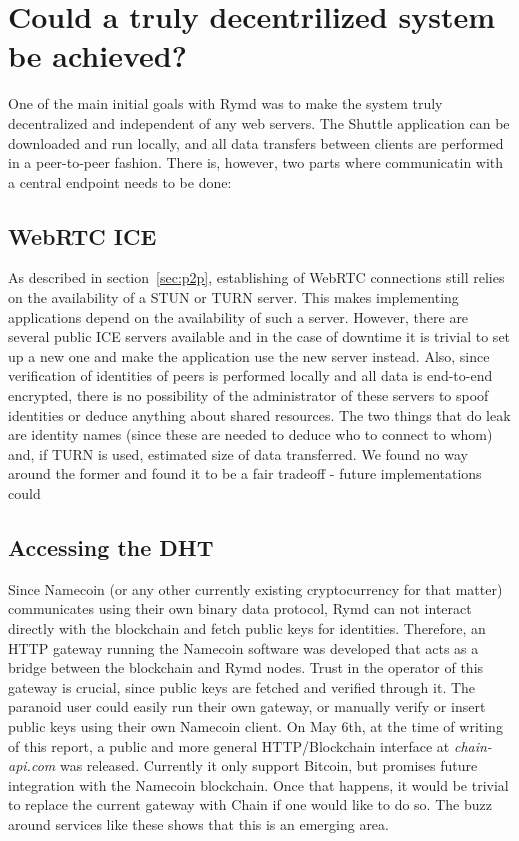 
\section{Could a truly decentrilized system be achieved?}
One of the main initial goals with Rymd was to make the system truly decentralized and independent of any web servers. The Shuttle application can be downloaded and run locally, and all data transfers between clients are performed in a peer-to-peer fashion. There is, however, two parts where communicatin with a central endpoint needs to be done:
\subsection{WebRTC ICE}
As described in section~\ref{sec:p2p}, establishing of WebRTC connections still relies on the availability of a STUN or TURN server. This makes implementing applications depend on the availability of such a server. However, there are several public ICE servers available and in the case of downtime it is trivial to set up a new one and make the application use the new server instead. Also, since verification of identities of peers is performed locally and all data is end-to-end encrypted, there is no possibility of the administrator of these servers to spoof identities or deduce anything about shared resources. The two things that do leak are identity names (since these are needed to deduce who to connect to whom) and, if TURN is used, estimated size of data transferred. We found no way around the former and found it to be a fair tradeoff - future implementations could 

\subsection{Accessing the DHT}
Since Namecoin (or any other currently existing cryptocurrency for that matter) communicates using their own binary data protocol\cite{BitcoinSource:2014:Online}, Rymd can not interact directly with the blockchain and fetch public keys for identities. Therefore, an HTTP gateway running the Namecoin software was developed that acts as a bridge between the blockchain and Rymd nodes. Trust in the operator of this gateway is crucial, since public keys are fetched and verified through it. The paranoid user could easily run their own gateway, or manually verify or insert public keys using their own Namecoin client. On May 6th, at the time of writing of this report, a public and more general HTTP/Blockchain interface at \emph{chain-api.com}\cite{Chain:2014:Online} was released. Currently it only support Bitcoin, but promises future integration with the Namecoin blockchain. Once that happens, it would be trivial to replace the current gateway with Chain if one would like to do so. The buzz around services like these shows that this is an emerging area.

